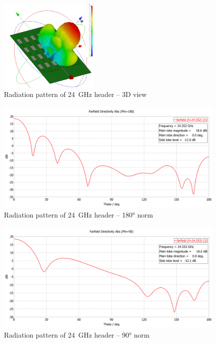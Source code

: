 \begin{figure}[h!]
  \centering
  \includegraphics[width=0.43\textwidth]{../img/farfield3d.png}
  \caption[Radiation pattern of 24~GHz header -- 3D view]{Radiation pattern of 24~GHz header -- 3D view}
  \label{fig:farfield3d}
\end{figure}

\begin{figure}[h!]
  \centering
  \includegraphics[width=\textwidth]{../img/farfield180.png}
  \caption[Radiation pattern of 24~GHz header -- 180° norm]{Radiation pattern of 24~GHz header -- 180° norm}
  \label{fig:farfield180}
\end{figure}

\begin{figure}[h!]
  \centering
  \includegraphics[width=\textwidth]{../img/farfield90.png}
  \caption[Radiation pattern of 24~GHz header -- 90° norm]{Radiation pattern of 24~GHz header -- 90° norm}
  \label{fig:farfield90}
\end{figure}


